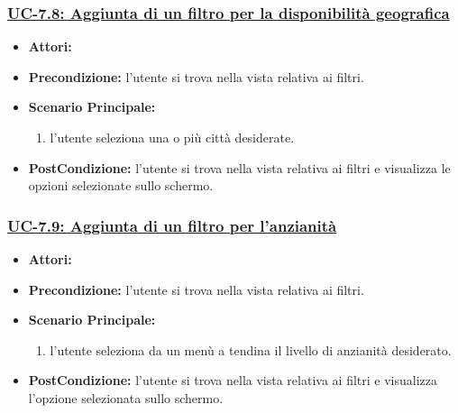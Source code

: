 \subsubsection{\underline{UC-7.8: Aggiunta di un filtro per la disponibilità geografica}}
\begin{itemize}
	\item \textbf{Attori:}\loggedusr
	\item \textbf{Precondizione:} l'utente si trova nella vista relativa ai filtri.
	\item \textbf{Scenario Principale:}
	\begin{enumerate}
		\item l'utente seleziona una o più città desiderate.
	\end{enumerate}
	\item \textbf{PostCondizione:}  l'utente si trova nella vista relativa ai filtri e visualizza le opzioni selezionate sullo schermo.
\end{itemize}

\subsubsection{\underline{UC-7.9: Aggiunta di un filtro per l'anzianità}}
\begin{itemize}
	\item \textbf{Attori:}\loggedusr
	\item \textbf{Precondizione:} l'utente si trova nella vista relativa ai filtri.
	\item \textbf{Scenario Principale:}
	\begin{enumerate}
		\item l'utente seleziona da un menù a tendina il livello di anzianità desiderato.
	\end{enumerate}
	\item \textbf{PostCondizione:}  l'utente si trova nella vista relativa ai filtri e visualizza l'opzione selezionata sullo schermo.
\end{itemize}

